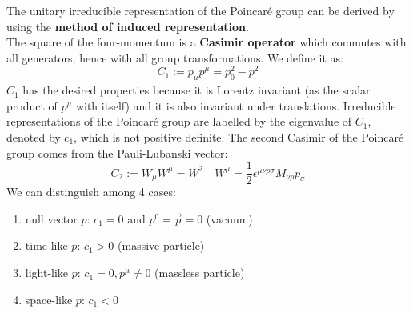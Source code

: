 \documentclass[../main.tex]{subfiles}
\begin{document}
The unitary irreducible representation of the Poincaré group can be derived by using the \textbf{method of induced representation}.\\
The square of the four-momentum is a \textbf{Casimir operator} which commutes with all generators, hence with all group transformations. We define it as:
\[
C_1:=p_\mu p^\mu=p_0^2-p^2
\]
$C_1$ has the desired properties because it is Lorentz invariant (as the scalar product of $p^\mu$ with itself) and it is also invariant under translations. Irreducible representations of the Poincaré group are labelled by the eigenvalue of $C_1$, denoted by $c_1$, which is not positive definite. The second Casimir of the Poincaré group comes from the \href{https://en.wikipedia.org/wiki/Pauli-Lubanski_pseudovector}{Pauli-Lubanski} vector:
\[
C_2:=W_\mu W^\mu=W^2 \quad W^\mu=\frac{1}{2}\epsilon^{\mu\nu\rho\sigma}M_{\nu\rho}p_\sigma
\]
We can distinguish among 4 cases:
\begin{enumerate}
    \item null vector $p$: $c_1=0$ and $p^0=\Vec{p}=0$ (vacuum)
    \item time-like $p$: $c_1>0$ (massive particle)
    \item light-like $p$: $c_1=0, p^\mu\neq0$ (massless particle)
    \item space-like $p$: $c_1<0$
\end{enumerate}
\end{document}
